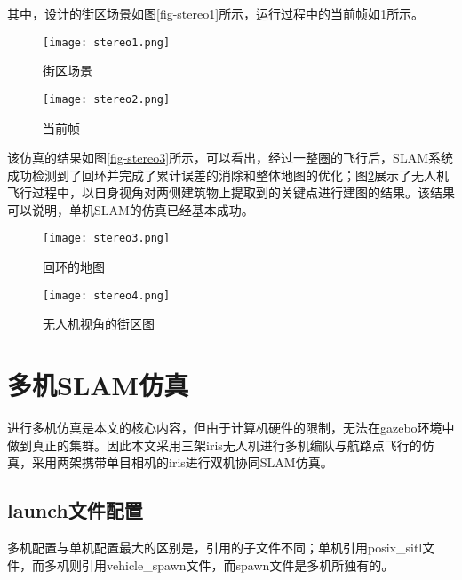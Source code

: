 其中，设计的街区场景如图\ref{fig-stereo1}所示，运行过程中的当前帧如\ref{fig-stereo2}所示。
~\\
\begin{figure}[htbp]
	\centering
	\begin{minipage}[t]{0.45\columnwidth}
		\centering
		\texttt{[image: stereo1.png]}
		\caption{街区场景}
		\label{fig-stereo1}
	\end{minipage}
	\begin{minipage}[t]{0.45\columnwidth}
		\centering
		\texttt{[image: stereo2.png]}
		\caption{当前帧}
		\label{fig-stereo2}
	\end{minipage}
\end{figure}

该仿真的结果如图\ref{fig-stereo3}所示，可以看出，经过一整圈的飞行后，SLAM系统成功检测到了回环并完成了累计误差的消除和整体地图的优化；图\ref{fig-stereo4}展示了无人机飞行过程中，以自身视角对两侧建筑物上提取到的关键点进行建图的结果。该结果可以说明，单机SLAM的仿真已经基本成功。
~\\
\begin{figure}[htbp]
	\centering
	\begin{minipage}[t]{0.45\columnwidth}
		\centering
		\texttt{[image: stereo3.png]}
		\caption{回环的地图}
		\label{fig-stereo3}
	\end{minipage}
	\begin{minipage}[t]{0.45\columnwidth}
		\centering
		\texttt{[image: stereo4.png]}
		\caption{无人机视角的街区图}
		\label{fig-stereo4}
	\end{minipage}
\end{figure}


\section{多机SLAM仿真}

进行多机仿真是本文的核心内容，但由于计算机硬件的限制，无法在gazebo环境中做到真正的集群。因此本文采用三架iris无人机进行多机编队与航路点飞行的仿真，采用两架携带单目相机的iris进行双机协同SLAM仿真。

\subsection{launch文件配置} \label{4.3.1}

多机配置与单机配置最大的区别是，引用的子文件不同；单机引用posix\_sitl文件，而多机则引用vehicle\_spawn文件，而spawn文件是多机所独有的。


